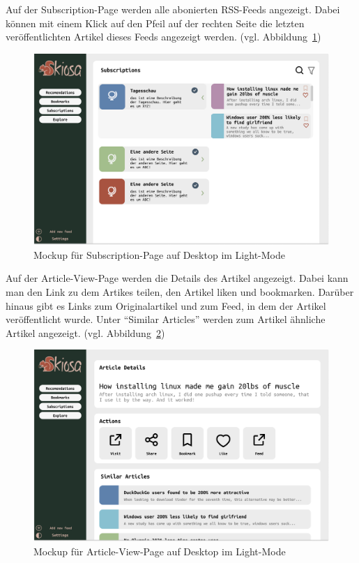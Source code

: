 Auf der Subscription-Page werden alle abonierten RSS-Feeds angezeigt. Dabei können mit einem Klick auf den Pfeil auf der rechten Seite die letzten veröffentlichten Artikel dieses Feeds angezeigt werden. (vgl. Abbildung~\ref{fig:Subscription Interface Desktop Light})

\begin{figure}[H]
    \includegraphics[width=\linewidth]{images/Subscription Interface Desktop Lightfigma-mockups.png}
    \caption{Mockup für Subscription-Page auf Desktop im Light-Mode}
    \label{fig:Subscription Interface Desktop Light}
\end{figure}

Auf der Article-View-Page werden die Details des Artikel angezeigt. Dabei kann man den Link zu dem Artikes teilen, den Artikel liken und bookmarken. 
Darüber hinaus gibt es Links zum Originalartikel und zum Feed, in dem der Artikel veröffentlicht wurde. Unter \enquote{Similar Articles} werden zum Artikel ähnliche Artikel angezeigt. (vgl. Abbildung~\ref{fig:View Page Desktop Light})

\begin{figure}[H]
    \includegraphics[width=\linewidth]{images/View Page Desktop Lightfigma-mockups.png}
    \caption{Mockup für Article-View-Page auf Desktop im Light-Mode}
    \label{fig:View Page Desktop Light}
\end{figure}

